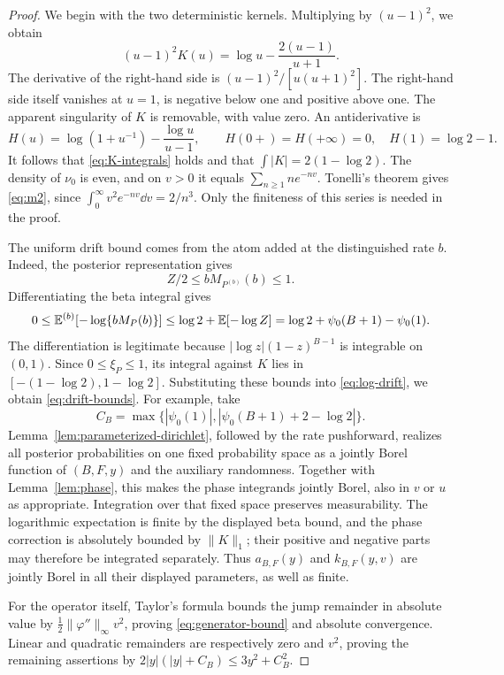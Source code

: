 \begin{proof}
We begin with the two deterministic kernels.
Multiplying by $(u-1)^2$, we obtain
\[
 (u-1)^2K(u)=\log u-\frac{2(u-1)}{u+1}.
\]
The derivative of the right-hand side is $(u-1)^2/[u(u+1)^2]$.
The right-hand side itself vanishes at $u=1$, is negative below one and positive above one.
The apparent singularity of $K$ is removable, with value zero.
An antiderivative is
\[
 H(u)=\log(1+u^{-1})-\frac{\log u}{u-1},\qquad
 H(0+)=H(+\infty)=0,\quad H(1)=\log2-1.
\]
It follows that \eqref{eq:K-integrals} holds and that $\int|K|=2(1-\log2)$.
The density of $\nu_0$ is even, and on $v>0$ it equals $\sum_{n\geq1}ne^{-nv}$.
Tonelli's theorem gives \eqref{eq:m2}, since $\int_0^\infty v^2e^{-nv}\dd v=2/n^3$.
Only the finiteness of this series is needed in the proof.

The uniform drift bound comes from the atom added at the distinguished rate $b$.
Indeed, the posterior representation gives
\[
 Z/2\leq bM_{P^{(b)}}(b)\leq1.
\]
Differentiating the beta integral gives
\[
 0\leq\mathbb E^{(b)}[-\log\{bM_P(b)\}]
 \leq\log2+\mathbb E[-\log Z]
 =\log2+\psi_0(B+1)-\psi_0(1).
\]
The differentiation is legitimate because $|\log z|(1-z)^{B-1}$ is integrable on $(0,1)$.
Since $0\leq\xi_P\leq1$, its integral against $K$ lies in $[-(1-\log2),1-\log2]$.
Substituting these bounds into \eqref{eq:log-drift}, we obtain \eqref{eq:drift-bounds}.
For example, take
\[
 C_B=\max\{|\psi_0(1)|,
                 |\psi_0(B+1)+2-\log2|\}.
\]
Lemma~\ref{lem:parameterized-dirichlet}, followed by the rate pushforward, realizes all posterior probabilities on one fixed probability space as a jointly Borel function of $(B,F,y)$ and the auxiliary randomness.
Together with Lemma~\ref{lem:phase}, this makes the phase integrands jointly Borel, also in $v$ or $u$ as appropriate.
Integration over that fixed space preserves measurability.
The logarithmic expectation is finite by the displayed beta bound, and the phase correction is absolutely bounded by $\|K\|_1$; their positive and negative parts may therefore be integrated separately.
Thus $a_{B,F}(y)$ and $k_{B,F}(y,v)$ are jointly Borel in all their displayed parameters, as well as finite.

For the operator itself, Taylor's formula bounds the jump remainder in absolute value by $\frac12\|\varphi''\|_\infty v^2$, proving \eqref{eq:generator-bound} and absolute convergence.
Linear and quadratic remainders are respectively zero and $v^2$, proving the remaining assertions by $2|y|(|y|+C_B)\leq3y^2+C_B^2$.
\end{proof}

